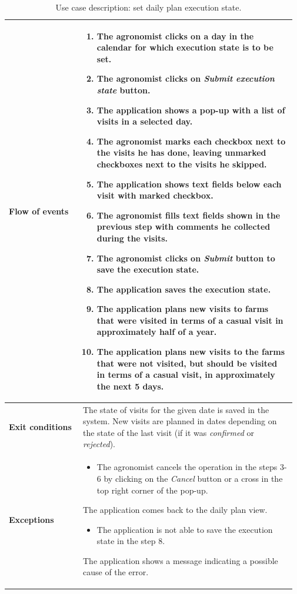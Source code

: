 \begin{table}[H]
\begin{tabular}{@{}p{0.25\linewidth} p{0.72\linewidth}@{}}
		\textbf{Flow of events}     & \begin{enumerate}[leftmargin=.4cm,noitemsep,topsep=0pt,before=\vspace{-3mm},after=\vspace{-4mm}]
		    \item The agronomist clicks on a day in the calendar for which execution state is to be set.
		    \item The agronomist clicks on \textit{Submit execution state} button.
		    \item The application shows a pop-up with a list of visits in a selected day.
		    \item The agronomist marks each checkbox next to the visits he has done, leaving unmarked checkboxes next to the visits he skipped.
		    \item The application shows text fields below each visit with marked checkbox.
		    \item The agronomist fills text fields shown in the previous step with comments he collected during the visits.
		    \item The agronomist clicks on \textit{Submit} button to save the execution state.
		    \item The application saves the execution state.
		    \item The application plans new visits to farms that were visited in terms of a casual visit in approximately half of a year.
		    \item The application plans new visits to the farms that were not visited, but should be visited in terms of a casual visit, in approximately the next 5 days.
		\end{enumerate}\\
		\midrule
		\textbf{Exit conditions}    & The state of visits for the given date is saved in the system. New visits are planned in dates depending on the state of the last visit (if it was \textit{confirmed} or \textit{rejected}). \\
		\midrule
		
		\textbf{Exceptions}         & \begin{itemize}[leftmargin=.4cm,noitemsep,topsep=0pt,before=\vspace{-3mm}]
		   \item The agronomist cancels the operation in the steps 3-6 by clicking on the \textit{Cancel} button or a cross in the top right corner of the pop-up.
		\end{itemize}
		The application comes back to the daily plan view.
	    \begin{itemize}[leftmargin=.4cm,noitemsep,topsep=0pt]
		   \item The application is not able to save the execution state in the step 8. 
		\end{itemize}
		The application shows a message indicating a possible cause of the error.
	    \\\bottomrule
	\end{tabular}
	\caption{Use case description: set daily plan execution state.} 
\end{table}


